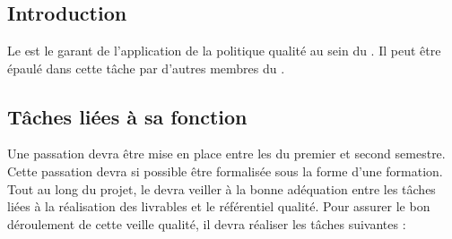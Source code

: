 \newpage
\section{\RQ}
\subsection*{Introduction}

Le \RQ{} est le garant de l’application de la politique qualité au sein du \PICCourt. Il peut être épaulé dans cette tâche par d’autres membres du \PICCourt.

\subsection*{Tâches liées à sa fonction}

Une passation devra être mise en place entre les \RQs{} du premier et second semestre. Cette passation devra si possible être formalisée sous la forme d’une formation.\\
Tout au long du projet, le \RQ{} devra veiller à la bonne adéquation entre les tâches liées à la réalisation des livrables et le référentiel qualité. Pour assurer le bon déroulement de cette veille qualité, il devra réaliser les tâches suivantes :

